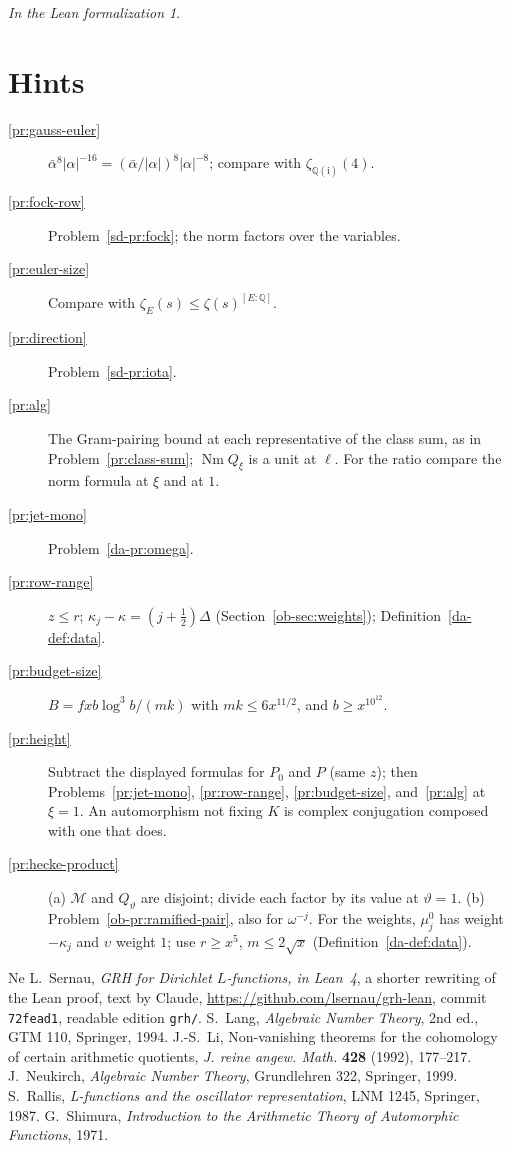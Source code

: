 \documentclass[reqno]{amsart}
\theoremstyle{definition}
\theoremstyle{plain}
\theoremstyle{remark}
\newtheorem*{leanremark}{In the Lean formalization}
\newcommand{\Q}{\mathbb{Q}}
\newcommand{\Mcal}{\mathcal{M}}
\newcommand{\ii}{\mathrm{i}}
\newcommand{\Nm}{\operatorname{Nm}}
\begin{document}
\begin{leanremark}
\end{leanremark}

\section*{Hints}

\begin{description}
\item[\ref{pr:gauss-euler}] \(\bar\alpha^8\lvert\alpha\rvert^{-16} = (\bar\alpha/\lvert\alpha\rvert)^8\lvert\alpha\rvert^{-8}\); compare with \(\zeta_{\Q(\ii)}(4)\).
\item[\ref{pr:fock-row}] Problem~\ref{sd-pr:fock}; the norm factors over the variables.
\item[\ref{pr:euler-size}] Compare with \(\zeta_E(s) \le \zeta(s)^{[E:\Q]}\).
\item[\ref{pr:direction}] Problem~\ref{sd-pr:iota}.  \item[\ref{pr:alg}] The Gram-pairing bound at each representative of the class sum, as in Problem~\ref{pr:class-sum}; \(\Nm Q_\xi\) is a unit at \(\ell\).  For the ratio compare the norm formula at \(\xi\) and at \(1\).
\item[\ref{pr:jet-mono}] Problem~\ref{da-pr:omega}.  \item[\ref{pr:row-range}] \(z \le r\); \(\kappa_j - \kappa = (j+\tfrac12)\Delta\) (Section~\ref{ob-sec:weights}); Definition~\ref{da-def:data}.
\item[\ref{pr:budget-size}] \(B = fxb\log^3 b/(mk)\) with \(mk \le 6x^{11/2}\), and \(b \ge x^{10^{12}}\).
\item[\ref{pr:height}] Subtract the displayed formulas for \(P_0\) and \(P\) (same \(z\)); then Problems~\ref{pr:jet-mono}, \ref{pr:row-range}, \ref{pr:budget-size}, and~\ref{pr:alg} at \(\xi = 1\).  An automorphism not fixing \(K\) is complex conjugation composed with one that does.
\item[\ref{pr:hecke-product}] (a) \(\Mcal\) and \(Q_\vartheta\) are disjoint; divide each factor by its value at \(\vartheta = 1\).  (b) Problem~\ref{ob-pr:ramified-pair}, also for \(\omega^{-j}\).  For the weights, \(\mu_j^0\) has weight \(-\kappa_j\) and \(\upsilon\) weight \(1\); use \(r \ge x^5\), \(m \le 2\sqrt x\) (Definition~\ref{da-def:data}).
\end{description}

\begin{thebibliography}{Ne}
 L.~Sernau, \emph{GRH for Dirichlet \(L\)-functions, in Lean~4}, a shorter rewriting of the Lean proof, text by Claude, \url{https://github.com/lsernau/grh-lean}, commit \texttt{72fead1}, readable edition \texttt{grh/}.
 S.~Lang, \emph{Algebraic Number Theory}, 2nd ed., GTM 110, Springer, 1994.
 J.-S.~Li, Non-vanishing theorems for the cohomology of certain arithmetic quotients, \emph{J. reine angew. Math.} \textbf{428} (1992), 177--217.
 J.~Neukirch, \emph{Algebraic Number Theory}, Grundlehren 322, Springer, 1999.
 S.~Rallis, \emph{L-functions and the oscillator representation}, LNM 1245, Springer, 1987.
 G.~Shimura, \emph{Introduction to the Arithmetic Theory of Automorphic Functions}, 1971.
\end{thebibliography}
\end{document}
